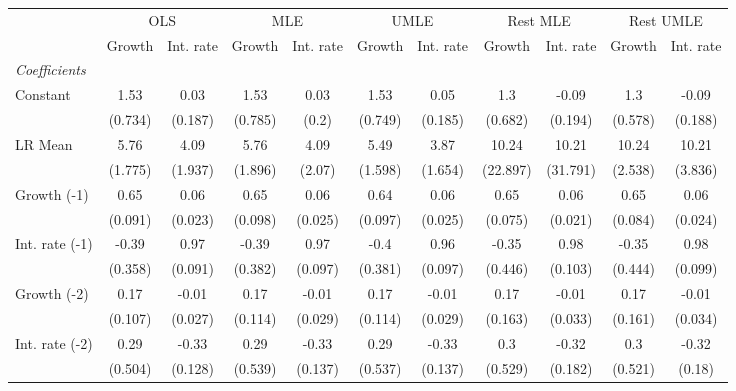 \begin{table}[htbp] 
	\centering
	\begin{tabular}{@{\extracolsep{4pt}}lcccccccccc@{}}		\hline\hline
		 		 & \multicolumn{2}{c}{OLS} &\multicolumn{2}{c}{MLE} &\multicolumn{2}{c}{UMLE} &\multicolumn{2}{c}{Rest MLE} &\multicolumn{2}{c}{Rest UMLE} \\ 
 		 & Growth 	 & Int. rate 	 & Growth 	 & Int. rate 	 & Growth 	 & Int. rate 	 & Growth 	 & Int. rate 	 & Growth 	 & Int. rate\\\cline{2-3}\cline{4-5}\cline{6-7}\cline{8-9}\cline{10-11}
\rule{0pt}{4ex} 
 \emph{Coefficients} 	  		 & 		 & 		 & 		 & 		 & 		 & 		 & 		 & 		 & 		 &\\ 
\quad Constant 	 & 1.53 	 & 0.03 	 & 1.53 	 & 0.03 	 & 1.53 	 & 0.05 	 & 1.3 	 & -0.09 	 & 1.3 	 & -0.09	 \\ 
 		 & (0.734) 	 & (0.187) 	 & (0.785) 	 & (0.2) 	 & (0.749) 	 & (0.185) 	 & (0.682) 	 & (0.194) 	 & (0.578) 	 & (0.188) 	 \\ 
\quad LR Mean 	 & 5.76 	 & 4.09 	 & 5.76 	 & 4.09 	 & 5.49 	 & 3.87 	 & 10.24 	 & 10.21 	 & 10.24 	 & 10.21	 \\ 
 		 & (1.775) 	 & (1.937) 	 & (1.896) 	 & (2.07) 	 & (1.598) 	 & (1.654) 	 & (22.897) 	 & (31.791) 	 & (2.538) 	 & (3.836) 	 \\ 
\quad Growth (-1) 	 &0.65 	 & 0.06 	 & 0.65 	 & 0.06 	 & 0.64 	 & 0.06 	 & 0.65 	 & 0.06 	 & 0.65 	 & 0.06	 \\ 
 		 & (0.091) 	 & (0.023) 	 & (0.098) 	 & (0.025) 	 & (0.097) 	 & (0.025) 	 & (0.075) 	 & (0.021) 	 & (0.084) 	 & (0.024) 	 \\ 
\quad Int. rate (-1) 	 &-0.39 	 & 0.97 	 & -0.39 	 & 0.97 	 & -0.4 	 & 0.96 	 & -0.35 	 & 0.98 	 & -0.35 	 & 0.98	 \\ 
 		 & (0.358) 	 & (0.091) 	 & (0.382) 	 & (0.097) 	 & (0.381) 	 & (0.097) 	 & (0.446) 	 & (0.103) 	 & (0.444) 	 & (0.099) 	 \\ 
\quad Growth (-2) 	 &0.17 	 & -0.01 	 & 0.17 	 & -0.01 	 & 0.17 	 & -0.01 	 & 0.17 	 & -0.01 	 & 0.17 	 & -0.01	 \\ 
 		 & (0.107) 	 & (0.027) 	 & (0.114) 	 & (0.029) 	 & (0.114) 	 & (0.029) 	 & (0.163) 	 & (0.033) 	 & (0.161) 	 & (0.034) 	 \\ 
\quad Int. rate (-2) 	 &0.29 	 & -0.33 	 & 0.29 	 & -0.33 	 & 0.29 	 & -0.33 	 & 0.3 	 & -0.32 	 & 0.3 	 & -0.32	 \\ 
 		 & (0.504) 	 & (0.128) 	 & (0.539) 	 & (0.137) 	 & (0.537) 	 & (0.137) 	 & (0.529) 	 & (0.182) 	 & (0.521) 	 & (0.18) 	 \\ 

\end{tabular}
\end{table}
